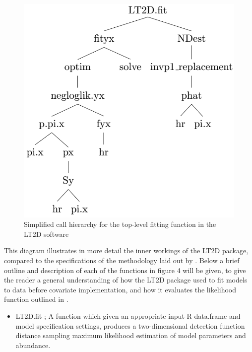 \documentclass[11pt]{article}
\begin{document}
\begin{multicols}{2}
\begin{figure}[H]
\centering
\includegraphics[scale=0.507]{LT2Dprecov}
\caption{Simplified call hierarchy for the top-level fitting function in the LT2D software}
\end{figure}
This diagram illustrates in more detail the inner workings of the LT2D package, compared to the specifications of the methodology laid out by \cite{Borchers}. Below a brief outline and description of each of the functions in figure 4 will be given, to give the reader a general understanding of how the LT2D package used to fit models to data before covariate implementation, and how it evaluates the likelihood function outlined in \cite{Borchers}.

\begin{itemize}
\item LT2D.fit ; A function which given an appropriate input R data.frame and model specification settings, produces a two-dimensional detection function distance sampling maximum likelihood estimation of model parameters and abundance.


\end{itemize}
\end{multicols}
\end{document}

